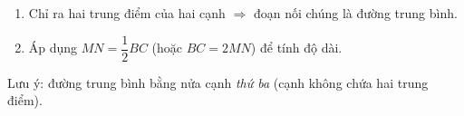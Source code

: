 \begin{enumerate}
\item Chỉ ra hai trung điểm của hai cạnh $\Rightarrow$ đoạn nối chúng là đường trung bình.
\item Áp dụng $MN=\dfrac12BC$ (hoặc $BC=2MN$) để tính độ dài.
\end{enumerate}
Lưu ý: đường trung bình bằng nửa cạnh \textit{thứ ba} (cạnh không chứa hai trung điểm).
